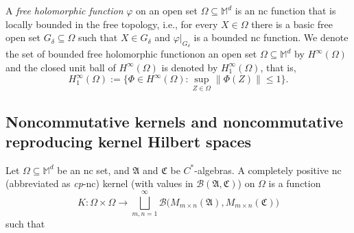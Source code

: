 \documentclass[12pt]{amsart}%
\numberwithin{equation}{section}
\newcommand{\cB}{\mathcal{B}}
\newcommand{\bM}{\mathbb{M}}
\newcommand{\fA}{{\mathfrak{A}}}
\newcommand{\fC}{{\mathfrak{C}}}
\begin{document}
A \textit{free holomorphic function} $\varphi$ on an open set $\Omega\subseteq \bM^d$ is an nc function that is locally bounded in the free topology, i.e., for every $X\in\Omega$  there is a basic free open set $G_{\delta}\subseteq\Omega$ such that $X\in G_{\delta}$ and $\varphi|_{G_{\delta}}$ is a bounded nc function. We denote the set of bounded free holomorphic functionon an open set $\Omega\subseteq\bM^d$ by $H^{\infty}(\Omega)$ and the closed unit ball of $H^{\infty}(\Omega)$ is denoted by $H^{\infty}_1(\Omega)$, that is,
\[
H^{\infty}_1(\Omega):=\big\{\Phi\in H^{\infty}(\Omega): \sup_{Z\in \Omega}\|\Phi(Z)\|\leq 1 \big\}.
\]

\subsection{Noncommutative kernels and noncommutative reproducing kernel Hilbert spaces}\label{Sub: nc RKHS} Let $\Omega\subseteq\bM^d$ be an nc set, and $\fA$ and $\fC$ be $C^*$-algebras. A completely positive nc (abbreviated as \textit{cp}-nc) kernel (with values in $\cB(\fA,\fC)$) on $\Omega$ is a function
\[
K:\Omega\times\Omega\to\bigsqcup_{m,n=1}^{\infty} \cB\big(M_{m\times n}(\fA), M_{m\times n}(\fC)\big)
\]
such that 
\end{document}
